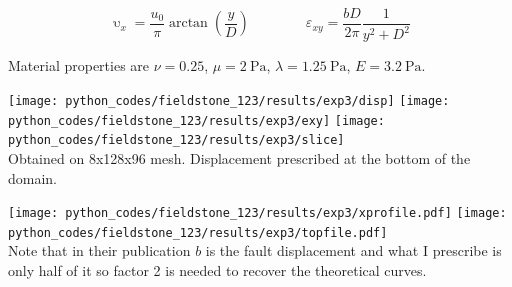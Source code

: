 \[
\upupsilon_x=\frac{u_0}{\pi} \arctan\left(\frac{y}{D}\right)
\quad\quad
\quad\quad
{\varepsilon}_{xy} = \frac{bD}{2\pi}  \frac{1}{y^2+D^2}
\]

Material properties are $\nu=0.25$, $\mu=\SI{2}{\pascal}$, $\lambda=\SI{1.25}{\pascal}$,
$E=\SI{3.2}{\pascal}$. 

\begin{center}
\texttt{[image: python\_codes/fieldstone\_123/results/exp3/disp]}
\texttt{[image: python\_codes/fieldstone\_123/results/exp3/exy]}
\texttt{[image: python\_codes/fieldstone\_123/results/exp3/slice]}\\
{\captionfont Obtained on 8x128x96 mesh. Displacement prescribed at the bottom of the domain.}
\end{center}


\begin{center}
\texttt{[image: python\_codes/fieldstone\_123/results/exp3/xprofile.pdf]}
\texttt{[image: python\_codes/fieldstone\_123/results/exp3/topfile.pdf]}\\
{\captionfont Note that in their publication $b$ is the fault displacement 
and what I prescribe is only half of it so factor 2 is needed to recover the theoretical curves.}
\end{center}


